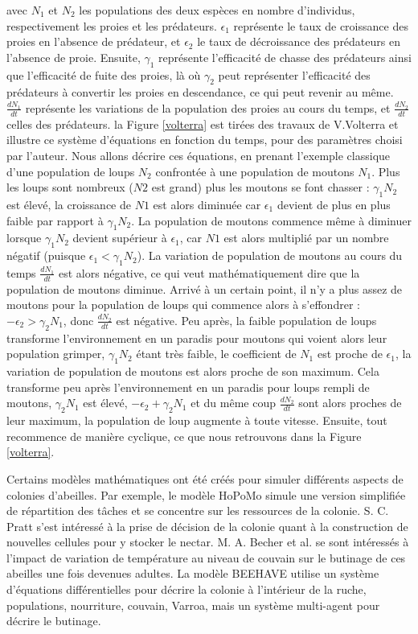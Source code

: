 		avec $N_1$ et $N_2$ les populations des deux espèces en nombre d'individus, respectivement les proies et les prédateurs. $\epsilon_1$ représente le taux de croissance des proies en l'absence de prédateur, et $\epsilon_2$ le taux de décroissance des prédateurs en l'absence de proie. Ensuite, $\gamma_1$ représente l'efficacité de chasse des prédateurs ainsi que l'efficacité de fuite des proies, là où $\gamma_2$ peut représenter l'efficacité des prédateurs à convertir les proies en descendance, ce qui peut revenir au même. $\frac{dN_1}{dt}$ représente les variations de la population des proies au cours du temps, et $\frac{dN_2}{dt}$ celles des prédateurs. la Figure \ref{volterra} est tirées des travaux de V.Volterra et illustre ce système d'équations en fonction du temps, pour des paramètres choisi par l'auteur. Nous allons décrire ces équations, en prenant l'exemple classique d'une population de loups $N_2$ confrontée à une population de moutons $N_1$. Plus les loups sont nombreux ($N2$ est grand) plus les moutons se font chasser : $\gamma_1 N_2$ est élevé, la croissance de $N1$ est alors diminuée car $\epsilon_1$ devient de plus en plus faible par rapport à $\gamma_1 N_2$. La population de moutons commence même à diminuer lorsque $\gamma_1 N_2$ devient supérieur à $\epsilon_1$, car $N1$ est alors multiplié par un nombre négatif (puisque $\epsilon_1 < \gamma_1 N_2$). La variation de population de moutons au cours du temps $\frac{dN_1}{dt}$ est alors négative, ce qui veut mathématiquement dire que la population de moutons diminue. Arrivé à un certain point, il n'y a plus assez de moutons pour la population de loups qui commence alors à s'effondrer : $-\epsilon_2 > \gamma_2 N_1$, donc $\frac{dN_2}{dt}$ est négative. Peu après, la faible population de loups transforme l'environnement en un paradis pour moutons qui voient alors leur population grimper, $\gamma_1 N_2$ étant très faible, le coefficient de $N_1$ est proche de $\epsilon_1$, la variation de population de moutons est alors proche de son maximum. Cela transforme peu après l'environnement en un paradis pour loups rempli de moutons, $\gamma_2 N_1$ est élevé, $- \epsilon_2 + \gamma_2 N_1$ et du même coup $\frac{dN_2}{dt}$ sont alors proches de leur maximum, la population de loup augmente à toute vitesse. Ensuite, tout recommence de manière cyclique, ce que nous retrouvons dans la Figure \ref{volterra}.
		
		Certains modèles mathématiques ont été créés pour simuler différents aspects de colonies d'abeilles. Par exemple, le modèle HoPoMo \cite{schmickl_hopomo_2007} simule une version simplifiée de répartition des tâches et se concentre sur les ressources de la colonie. S. C. Pratt \cite{pratt_optimal_1999} s'est intéressé à la prise de décision de la colonie quant à la construction de nouvelles cellules pour y stocker le nectar. M. A. Becher et al. \cite{becher_brood_2010} se sont intéressés à l'impact de variation de température au niveau de couvain sur le butinage de ces abeilles une fois devenues adultes. La modèle BEEHAVE \cite{becher_beehave_2014} utilise un système d'équations différentielles pour décrire la colonie à l'intérieur de la ruche, populations, nourriture, couvain, Varroa, mais un système multi-agent pour décrire le butinage.
		
